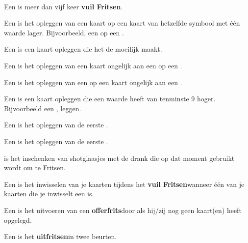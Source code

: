 \newpage
\drawBar{}

\

\item Een  is meer dan vijf keer \textbf{vuil Fritsen}\footnotemark[1].

\item Een  is het opleggen van een kaart op een kaart van hetzelfde symbool met \'e\'en waarde lager. Bijvoorbeeld, een  op een .

\item Een  is een kaart opleggen die het de \andereSpelers moeilijk maakt.

\item Een  is het opleggen van een kaart ongelijk aan een  op een .

\item Een  is het opleggen van een  op een kaart ongelijk aan een .

\item Een  is een kaart opleggen die een waarde heeft van tenminste 9 hoger. Bijvoorbeeld een ,  leggen.

\item Een  is het opleggen van de eerste .

\item Een  is het opleggen van de eerste .

\item {} is het inschenken van shotglaasjes met de drank die op dat moment gebruikt wordt om te Fritsen.

\item Een  is het inwisselen van je kaarten tijdens het \textbf{vuil Fritsen}\footnotemark[1] wanneer één van je kaarten die je inwisselt een  is. 

\item Een  is het uitvoeren van een \textbf{offerfrits}\footnotemark[2] door \Willem als hij/zij nog geen kaart(en) heeft opgelegd.

\item Een  is het \textbf{uitfritsen}\footnotemark[3] in twee beurten\footnotemark[4].


